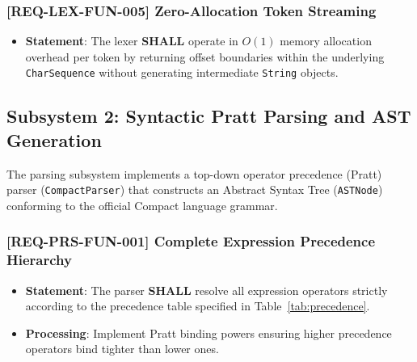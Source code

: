 \subsubsection{[REQ-LEX-FUN-005] Zero-Allocation Token Streaming}
\begin{itemize}
    \item \textbf{Statement}: The lexer \textbf{SHALL} operate in $O(1)$ memory allocation overhead per token by returning offset boundaries within the underlying \texttt{CharSequence} without generating intermediate \texttt{String} objects.
\end{itemize}

\subsection{Subsystem 2: Syntactic Pratt Parsing and AST Generation}
\label{sec:subsystem_parser}

The parsing subsystem implements a top-down operator precedence (Pratt) parser (\texttt{CompactParser}) that constructs an Abstract Syntax Tree (\texttt{ASTNode}) conforming to the official Compact language grammar.

\subsubsection{[REQ-PRS-FUN-001] Complete Expression Precedence Hierarchy}
\begin{itemize}
    \item \textbf{Statement}: The parser \textbf{SHALL} resolve all expression operators strictly according to the precedence table specified in Table~\ref{tab:precedence}.
    \item \textbf{Processing}: Implement Pratt binding powers ensuring higher precedence operators bind tighter than lower ones.
\end{itemize}


